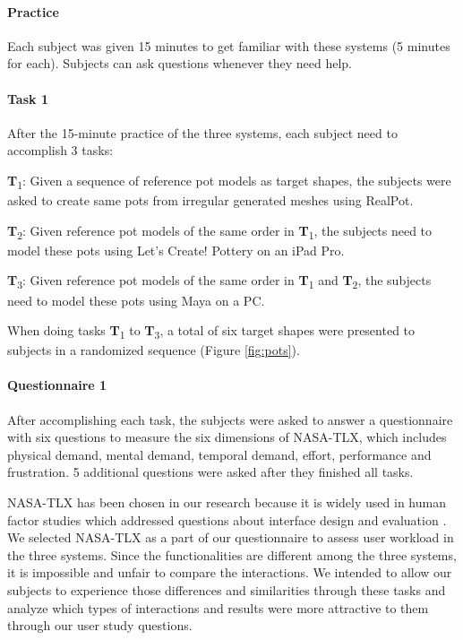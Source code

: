 \paragraph{Practice} Each subject was given 15 minutes to get familiar with these systems (5 minutes for each). Subjects can ask questions whenever they need help.

\paragraph{Task 1} After the 15-minute practice of the three systems, each subject need to accomplish 3 tasks:

\textbf{T}\textsubscript{1}: Given a sequence of reference pot models as target shapes, the subjects were asked to create same pots from irregular generated meshes using RealPot. 

\textbf{T}\textsubscript{2}: Given reference pot models of the same order in \textbf{T}\textsubscript{1}, the subjects need to model these pots using Let's Create! Pottery on an iPad Pro.

\textbf{T}\textsubscript{3}: Given reference pot models of the same order in \textbf{T}\textsubscript{1} and \textbf{T}\textsubscript{2}, the subjects need to model these pots using Maya on a PC.

When doing tasks \textbf{T}\textsubscript{1} to \textbf{T}\textsubscript{3}, a total of six target shapes were presented to subjects in a randomized sequence (Figure \ref{fig:pots}).

\paragraph{Questionnaire 1} After accomplishing each task, the subjects were asked to answer a questionnaire with six questions to measure the six dimensions of NASA-TLX, which includes physical demand, mental demand, temporal demand, effort, performance and frustration. 5 additional questions were asked after they finished all tasks.

NASA-TLX has been chosen in our research because it is widely used in human factor studies which addressed questions about interface design and evaluation \cite{hart2006nasa}.
We selected NASA-TLX as a part of our questionnaire to assess user workload in the three systems.
Since the functionalities are different among the three systems, it is impossible and unfair to compare the interactions.
We intended to allow our subjects to experience those differences and similarities through these tasks and analyze which types of interactions and results were more attractive to them through our user study questions.

